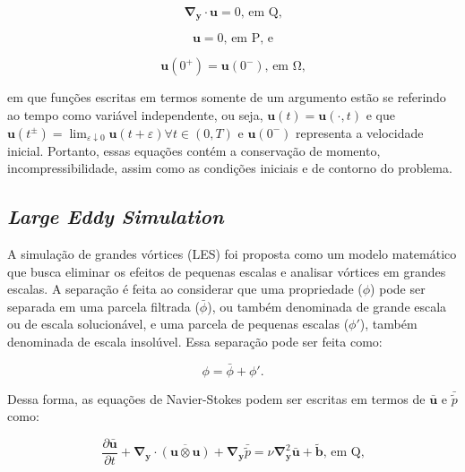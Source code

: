 \documentclass[_ArquivoPrincipal.tex]{subfiles}
\begin{document}
\begin{equation}
    \mathbf{\nabla}_\mathbf{y}\cdot\mathbf{u}=0\text{, em }\mathrm{Q}\text{,}
    \label{Sist2}
\end{equation}

\begin{equation}
    \mathbf{u}=0\text{, em }\mathrm{P}\text{, e}
    \label{Sist3}
\end{equation}

\begin{equation}
    \mathbf{u}(0^+)=\mathbf{u}(0^-)\text{, em }\mathrm{\Omega}\text{,}
    \label{Sist4}
\end{equation}

\noindent em que funções escritas em termos somente de um argumento estão se referindo ao tempo como variável independente, ou seja, $\mathbf{u}(t)=\mathbf{u}(\cdot,t)$ e que $\mathbf{u}(t^\pm)=\lim_{\varepsilon\downarrow0}{\mathbf{u}(t+\varepsilon)\forall t\in(0,T)}$ e $\mathbf{u}(0^-)$ representa a velocidade inicial. Portanto, essas equações contém a conservação de momento, incompressibilidade, assim como as condições iniciais e de contorno do problema.

\subsection{\textit{Large Eddy Simulation}} \label{LES}

A simulação de grandes vórtices (LES) foi proposta como um modelo matemático que busca eliminar os efeitos de pequenas escalas e analisar vórtices em grandes escalas. A separação é feita ao considerar que uma propriedade ($\phi$) pode ser separada em uma parcela filtrada ($\bar{\phi}$), ou também denominada de grande escala ou de escala solucionável, e uma parcela de pequenas escalas ($\phi'$), também denominada de escala insolúvel. Essa separação pode ser feita como:

\begin{equation}
    \phi=\bar{\phi}+\phi'\text{.}
    \label{Sep}
\end{equation}

Dessa forma, as equações de Navier-Stokes podem ser escritas em termos de $\bar{\mathbf{u}}$ e $\bar{\tilde{p}}$ como:

\begin{equation}
    \frac{\partial\bar{\mathbf{u}}}{\partial t}+\mathbf{\nabla}_\mathbf{y}\cdot\overline{(\mathbf{u}\otimes\mathbf{u})}+\mathbf{\nabla}_\mathbf{y}\bar{\tilde{p}}=\nu\mathbf{\nabla}^2_\mathbf{y}\bar{\mathbf{u}}+\tilde{\mathbf{b}}\text{, em }\mathrm{Q}\text{,}
    \label{SistFilt1}
\end{equation}
\end{document}

